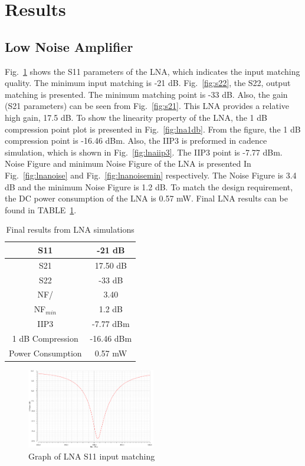 \section{Results}
\subsection{Low Noise Amplifier}
Fig.~\ref{fig:s11} shows the S11 parameters of the LNA, which indicates the input matching quality. The minimum input matching is -21 dB. Fig.~\ref{fig:s22}, the S22, output matching is presented. The minimum matching point is -33 dB. Also, the gain (S21 parameters) can be seen from Fig.~\ref{fig:s21}. This LNA provides a relative high gain, 17.5 dB. To show the linearity property of the LNA, the 1 dB compression point plot is presented in Fig.~\ref{fig:lna1db}. From the figure, the 1 dB compression point is -16.46 dBm. Also, the IIP3 is preformed in cadence simulation, which is shown in Fig.~\ref{fig:lnaiip3}. The IIP3 point is -7.77 dBm. Noise Figure and minimum Noise Figure of the LNA is presented In Fig.~\ref{fig:lnanoise} and Fig.~\ref{fig:lnanoisemin} respectively. The Noise Figure is 3.4 dB and the minimum Noise Figure is 1.2 dB. To match the design requirement, the DC power consumption of the LNA is 0.57 mW. Final LNA results can be found in TABLE~\ref{tab:lnaresults}.

\begin{table}[h]
\begin{center}
	\begin{tabular}{ c | c  }
 		                      
  		S11 & -21 dB \\ \hline
  		S21 &  17.50 dB \\ \hline
  		S22 & -33 dB \\ \hline
		NF/ & 3.40 \\ \hline
		NF$_{min}$ & 1.2 dB \\ \hline
		IIP3 & -7.77 dBm\\ \hline
		1 dB Compression & -16.46 dBm \\  \hline
		Power Consumption & 0.57 mW \\ 

	\end{tabular}

\end{center}
\caption{Final results from LNA simulations}
\label{tab:lnaresults}
\end{table}

\begin{figure}[H]
   \centering
    \includegraphics[width=0.5\textwidth]{figures/s11.png}
    \caption{Graph of LNA S11 input matching}
    \label{fig:s11}
\end{figure}

